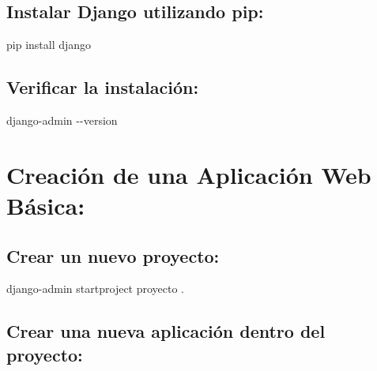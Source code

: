 \documentclass[
  a4paper,
  DIV=11,
  numbers=noendperiod,
  onepage,
  openany]{scrreprt}
\newenvironment{Shaded}{\begin{snugshade}}{\end{snugshade}}
\newcommand{\AttributeTok}[1]{\textcolor[rgb]{0.40,0.45,0.13}{#1}}
\newcommand{\ExtensionTok}[1]{\textcolor[rgb]{0.00,0.23,0.31}{#1}}
\newcommand{\NormalTok}[1]{\textcolor[rgb]{0.00,0.23,0.31}{#1}}
\begin{document}
\hypertarget{instalar-django-utilizando-pip-1}{%
\subsection{Instalar Django utilizando
pip:}\label{instalar-django-utilizando-pip-1}}

\begin{Shaded}
\begin{Highlighting}[]
\ExtensionTok{pip}\NormalTok{ install django}
\end{Highlighting}
\end{Shaded}

\hypertarget{verificar-la-instalaciuxf3n-1}{%
\subsection{Verificar la
instalación:}\label{verificar-la-instalaciuxf3n-1}}

\begin{Shaded}
\begin{Highlighting}[]
\ExtensionTok{django{-}admin} \AttributeTok{{-}{-}version}
\end{Highlighting}
\end{Shaded}

\hypertarget{creaciuxf3n-de-una-aplicaciuxf3n-web-buxe1sica-1}{%
\section{Creación de una Aplicación Web
Básica:}\label{creaciuxf3n-de-una-aplicaciuxf3n-web-buxe1sica-1}}

\hypertarget{crear-un-nuevo-proyecto-1}{%
\subsection{Crear un nuevo proyecto:}\label{crear-un-nuevo-proyecto-1}}

\begin{Shaded}
\begin{Highlighting}[]
\ExtensionTok{django{-}admin}\NormalTok{ startproject proyecto .}
\end{Highlighting}
\end{Shaded}

\hypertarget{crear-una-nueva-aplicaciuxf3n-dentro-del-proyecto-1}{%
\subsection{Crear una nueva aplicación dentro del
proyecto:}\label{crear-una-nueva-aplicaciuxf3n-dentro-del-proyecto-1}}
\end{document}
